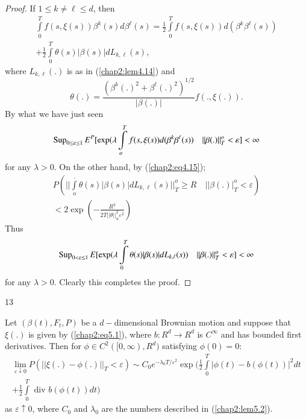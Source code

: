 \begin{proof}
If $1 \leq  k \neq \ell \leq d$, then 
\begin{gather*}
\int\limits_0^T f(s, \xi (s)) \beta^k (s) d \beta^{\ell}(s) =
\frac{1}{2} \int\limits_{0}^{T} f (s, \xi (s)) d( \beta^k \beta
^{\ell}(s))\\
 + \frac{1}{2} \int\limits_{0}^{T}\theta (s) |\beta (s) |
dL_{k, \ell }(s) , 
\end{gather*}
where $L_{k, \ell}(.) $ is as in (\ref{chap2:lem4.14}) and 
$$
\theta (.) = \frac{ ( \beta^k (.)^2 + \beta^{\ell}(.)^2 )^{1/2}}{
  | \beta (.)|} f(.,\xi (.)). 
$$
By what we have just seen
$$
\operatorname{Sup}_{0 \leq \varepsilon \leq 1}E^P [\exp (\lambda \int\limits_o^T
  f(s, \xi (s)) d ( \beta^k \beta^{\ell}(s)) \quad || \beta (.)
  ||_T^o < \varepsilon ] < \infty 
$$
for any $ \lambda > 0$. On the other  hand, by (\ref{chap2:eq4.15}); 
\begin{gather*}
P( || \int\limits_o^. \theta (s)|\beta(s) | dL_{k, \ell }(s) ||^o _T
\ge R \quad || \beta (.)| _T^o < \varepsilon )\\
 < 2 \exp \left(-\frac{R^2}{ 2T || \theta ||_u ^2 \varepsilon^2} \right) 
\end{gather*}
Thus\pageoriginale
$$ 
 \operatorname{Sup}_{0 < \varepsilon \leq1}E[ \exp(\lambda
   \int\limits_{0}^{T}\theta (s) | \beta (s)| dL_{k, \ell}(s)) \quad 
   || \beta(.) ||_T ^o < \varepsilon ] < \infty 
$$
for any $\lambda > 0$. Clearly this completes the proof.  
\end{proof}

\setcounter{theorem} {13}
\begin{theorem}\label{chap2:thm5.14}%
 Let $(\beta (t), F_t , P )$ be a $d-$dimensional Brownian motion and
 suppose that $\xi (.)$ is given  by (\ref{chap2:eq5.1}), where $b:R^d
 \rightarrow 
 R^d $ is $ C^{\infty}$  and has bounded first derivatives. Then for $
 \phi \in C^2 ( [0, \infty),R^d)$ satisfying $\phi (0) =0$: 
 \begin{gather*}
  \lim_{\varepsilon \downarrow 0} P ( || \xi (.) - \phi (.) ||_T < \varepsilon)
  \sim C_0 e^{-\lambda_0 T/ \varepsilon ^2}
  \exp(\frac{1}{2}\int\limits_0^T |\phi (t) -b(\phi(t)) |^2 dt\\
 +  \frac{1}{2} \int\limits_0^T \text{ div } b ( \phi (t))dt) 
 \end{gather*}
 as $\varepsilon \uparrow 0$, where $C_0$ and $\lambda_0$ are the
 numbers described in (\ref{chap2:lem5.2}). 
   \end{theorem}   

